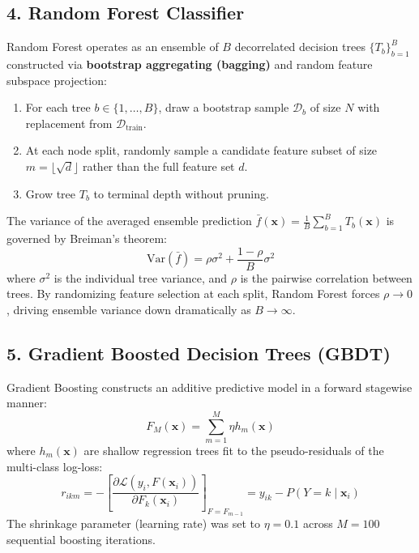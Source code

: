 \documentclass[12pt,a4paper,oneside]{report}
\begin{document}
\subsection{4. Random Forest Classifier}
Random Forest operates as an ensemble of $B$ decorrelated decision trees $\{T_b\}_{b=1}^B$ constructed via \textbf{bootstrap aggregating (bagging)} and random feature subspace projection:
\begin{enumerate}
    \item For each tree $b \in \{1, \dots, B\}$, draw a bootstrap sample $\mathcal{D}_b$ of size $N$ with replacement from $\mathcal{D}_{\text{train}}$.
    \item At each node split, randomly sample a candidate feature subset of size $m = \lfloor \sqrt{d} \rfloor$ rather than the full feature set $d$.
    \item Grow tree $T_b$ to terminal depth without pruning.
\end{enumerate}
The variance of the averaged ensemble prediction $\bar{f}(\mathbf{x}) = \frac{1}{B} \sum_{b=1}^B T_b(\mathbf{x})$ is governed by Breiman's theorem:
\begin{equation}
    \text{Var}(\bar{f}) = \rho \sigma^2 + \frac{1 - \rho}{B} \sigma^2
\end{equation}
where $\sigma^2$ is the individual tree variance, and $\rho$ is the pairwise correlation between trees. By randomizing feature selection at each split, Random Forest forces $\rho \to 0$, driving ensemble variance down dramatically as $B \to \infty$.

\subsection{5. Gradient Boosted Decision Trees (GBDT)}
Gradient Boosting constructs an additive predictive model in a forward stagewise manner:
\begin{equation}
    F_M(\mathbf{x}) = \sum_{m=1}^M \eta h_m(\mathbf{x})
\end{equation}
where $h_m(\mathbf{x})$ are shallow regression trees fit to the pseudo-residuals of the multi-class log-loss:
\begin{equation}
    r_{ikm} = -\left[ \frac{\partial \mathcal{L}(y_i, F(\mathbf{x}_i))}{\partial F_k(\mathbf{x}_i)} \right]_{F = F_{m-1}} = y_{ik} - P(Y = k \mid \mathbf{x}_i)
\end{equation}
The shrinkage parameter (learning rate) was set to $\eta = 0.1$ across $M = 100$ sequential boosting iterations.
\end{document}
